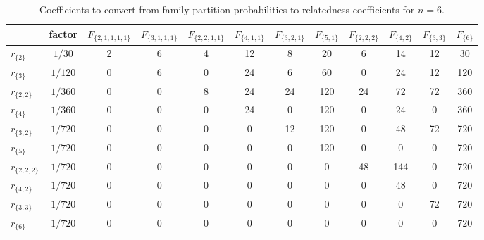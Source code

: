 \begin{table}[h]
\centering
\caption{Coefficients to convert from family partition probabilities to relatedness coefficients for $n=6$.}
\label{psi2rho6}
\begin{tabular}{lccccccccccc}
\toprule
                &  factor &  $F_{\{2,1,1,1,1\}}$ &  $F_{\{3,1,1,1\}}$ &  $F_{\{2,2,1,1\}}$ &  $F_{\{4,1,1\}}$ &  $F_{\{3,2,1\}}$ &  $F_{\{5,1\}}$ &  $F_{\{2,2,2\}}$ &  $F_{\{4,2\}}$ &  $F_{\{3,3\}}$ &  $F_{\{6\}}$ \\
\midrule
    $r_{\{2\}}$ &  $1/30$ &                    2 &                  6 &                  4 &               12 &                8 &             20 &                6 &             14 &             12 &           30 \\
    $r_{\{3\}}$ & $1/120$ &                    0 &                  6 &                  0 &               24 &                6 &             60 &                0 &             24 &             12 &          120 \\
  $r_{\{2,2\}}$ & $1/360$ &                    0 &                  0 &                  8 &               24 &               24 &            120 &               24 &             72 &             72 &          360 \\
    $r_{\{4\}}$ & $1/360$ &                    0 &                  0 &                  0 &               24 &                0 &            120 &                0 &             24 &              0 &          360 \\
  $r_{\{3,2\}}$ & $1/720$ &                    0 &                  0 &                  0 &                0 &               12 &            120 &                0 &             48 &             72 &          720 \\
    $r_{\{5\}}$ & $1/720$ &                    0 &                  0 &                  0 &                0 &                0 &            120 &                0 &              0 &              0 &          720 \\
$r_{\{2,2,2\}}$ & $1/720$ &                    0 &                  0 &                  0 &                0 &                0 &              0 &               48 &            144 &              0 &          720 \\
  $r_{\{4,2\}}$ & $1/720$ &                    0 &                  0 &                  0 &                0 &                0 &              0 &                0 &             48 &              0 &          720 \\
  $r_{\{3,3\}}$ & $1/720$ &                    0 &                  0 &                  0 &                0 &                0 &              0 &                0 &              0 &             72 &          720 \\
    $r_{\{6\}}$ & $1/720$ &                    0 &                  0 &                  0 &                0 &                0 &              0 &                0 &              0 &              0 &          720 \\
\bottomrule
\end{tabular}
\end{table}

